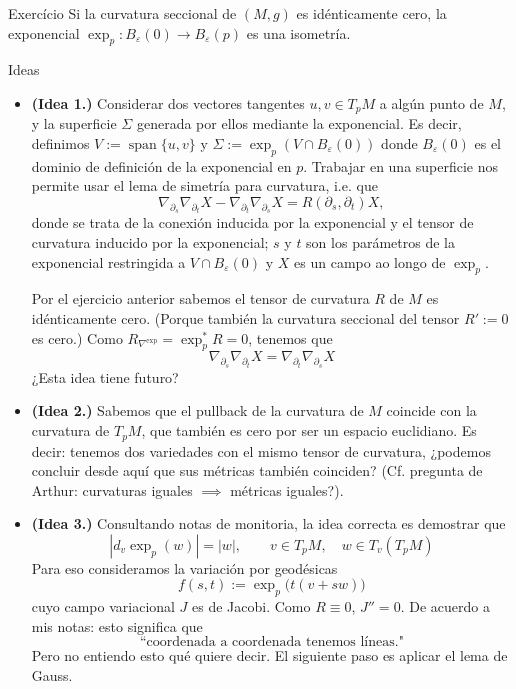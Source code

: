 \begin{thing6}{Exercício}\label{exer:}\leavevmode
Si la curvatura seccional de \((M,g)\) es idénticamente cero, la exponencial \(\operatorname{exp}_p:B_\varepsilon(0)\to B_\varepsilon(p)\) es una isometría.
\end{thing6}

\begin{thing4}{Ideas}\leavevmode
\begin{itemize}
\item \textbf{(Idea 1.)} Considerar dos vectores tangentes \(u,v \in T_pM\) a algún punto de \(M\), y la superficie \(\Sigma\) generada por ellos mediante la exponencial. Es decir, definimos \(V:=\operatorname{span}\{u,v\}\) y \(\Sigma:=\operatorname{exp}_p(V\cap B_{\varepsilon}(0))\) donde \(B_\varepsilon(0)\) es el dominio de definición de la exponencial en \(p\). Trabajar en una superficie nos permite usar el lema de simetría para curvatura, i.e. que
	\[\nabla_{\partial_s} \nabla_{\partial_t}X-\nabla_{\partial_t} \nabla_{\partial_s}X=R(\partial_s,\partial_t)X,\]
donde se trata de la conexión inducida por la exponencial y el tensor de curvatura inducido por la exponencial; \(s\) y \(t\) son los parámetros de la exponencial restringida a \(V \cap B_\varepsilon(0)\) y \(X\) es un campo ao longo de \(\operatorname{exp}_p\). 

Por el ejercicio anterior sabemos el tensor de curvatura \(R\) de \(M\) es idénticamente cero. (Porque también la curvatura seccional del tensor \(R':=0\) es cero.) Como \(R_{\nabla^{\operatorname{exp}}}=\operatorname{exp}_p^*R=0\), tenemos que
	\[\nabla_{\partial_s} \nabla_{\partial_t}X=\nabla_{\partial_t} \nabla_{\partial_s}X\]
{\color{2}¿Esta idea tiene futuro?}
\item \textbf{(Idea 2.)} Sabemos que el pullback de la curvatura de \(M\) coincide con la curvatura de \(T_pM\), que también es cero por ser un espacio euclidiano. Es decir: tenemos dos variedades con el mismo tensor de curvatura, ¿podemos concluir desde aquí que sus métricas también coinciden? (Cf. pregunta de Arthur: curvaturas iguales \(\implies\) métricas iguales?).

\item \textbf{(Idea 3.)} Consultando notas de monitoria, la idea correcta es demostrar que
	\[|d_v \operatorname{exp}_p(w)|=|w|,\qquad v \in T_pM, \quad w\in T_v(T_pM)\]
Para eso consideramos la variación por geodésicas
\[f(s,t):=\operatorname{exp}_p\Big(t(v+sw)\Big)\]
cuyo campo variacional \(J\) es de Jacobi. Como \(R\equiv0\), \(J''=0\). De acuerdo a mis notas: esto significa que
\[\text{``coordenada a coordenada tenemos líneas."} \]
Pero no entiendo esto qué quiere decir. El siguiente paso es aplicar el lema de Gauss.
\end{itemize}
\end{thing4}

